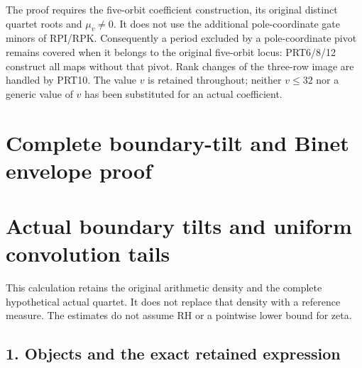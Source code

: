 \documentclass[11pt,a4paper]{article}
\begin{document}
The proof requires the five-orbit coefficient construction, its original
distinct quartet roots and $\mu_v\ne0$. It does not use the additional
pole-coordinate gate minors of RPI/RPK. Consequently a period excluded
by a pole-coordinate pivot remains covered when it belongs to the
original five-orbit locus: PRT6/8/12 construct all maps without that
pivot. Rank changes of the three-row image are handled by PRT10.
The value $v$ is retained throughout; neither $v\le32$ nor a generic
value of $v$ has been substituted for an actual coefficient.

\label{prt:MPBUILD:PRT_CONNECTING_ENDPOINT_RETURN:end}
\endgroup

\clearpage
\begingroup


\setcounter{equation}{0}
\renewcommand{\theequation}{BT.\arabic{equation}}
\section*{Complete boundary-tilt and Binet envelope proof}
\section{Actual boundary tilts and uniform convolution tails}\label{bt:actual-boundary-tilts-and-uniform-convolution-tails}

This calculation retains the original arithmetic density and the complete hypothetical actual quartet. It does not replace that density with a reference measure. The estimates do not assume RH or a pointwise lower bound for zeta.

\subsection{1. Objects and the exact retained expression}\label{bt:objects-and-the-exact-retained-expression}
\end{document}
